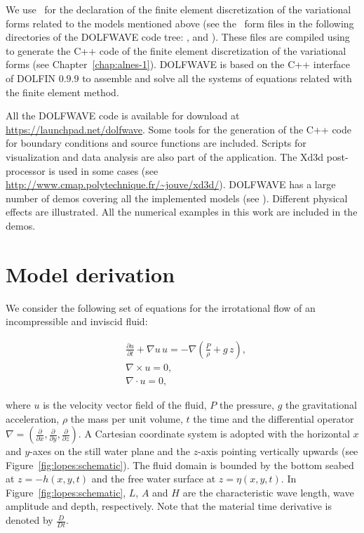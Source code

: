 We use \ufl\ for the declaration of the finite element discretization
of the variational forms related to the models mentioned above (see
the \ufl\ form files in the following directories of the DOLFWAVE code
tree: ,  and
).  These files are compiled using \ffc to
generate the C++ code of the finite element discretization of the
variational forms (see Chapter~\ref{chap:alnes-1}).  DOLFWAVE is based
on the C++ interface of DOLFIN $0.9.9$ to assemble and solve all the
systems of equations related with the finite element method.

All the DOLFWAVE code is available for download at
\url{https://launchpad.net/dolfwave}. Some tools for the generation of
the C++ code for boundary conditions and source functions are
included. Scripts for visualization and data analysis are also part of
the application. The Xd3d post-processor is used in some cases (see
\url{http://www.cmap.polytechnique.fr/~jouve/xd3d/}).  DOLFWAVE
has a large number of demos covering all the implemented models (see
). Different physical effects are illustrated.  All
the numerical examples in this work are included in the demos.


\section{Model derivation}
\label{sec:lopes:modelderivation}

We consider the following set of equations for the irrotational flow
of an incompressible and inviscid fluid:

\begin{subequations}\label{eq:lopes:euler}
\begin{align}
&\displaystyle\frac{\partial u}{\partial t}+\nabla u \,
  u=-\nabla\left(\frac{P}{\rho} +g\,
  z\right),\label{eq:lopes:euler-a} \\ &\nabla\times
  u={0},\label{eq:lopes:euler-b}
  \\ &\nabla\cdot{u}=0,\label{eq:lopes:euler-c}
\end{align}
\end{subequations}

where $u$ is the velocity vector field of the fluid, $P$ the pressure,
$g$ the gravitational acceleration, $\rho$ the mass per unit volume,
$t$ the time and the differential operator
$\nabla=\left(\frac{\partial }{\partial x},\frac{\partial }{\partial
y},\frac{\partial }{\partial z}\right).$ A Cartesian coordinate system
is adopted with the horizontal $x$ and $y$-axes on the still water
plane and the $z$-axis pointing vertically upwards (see
Figure~\ref{fig:lopes:schematic}).  The fluid domain is bounded by the
bottom seabed at $z=-h(x,y,t)$ and the free water surface at
$z=\eta(x,y,t)$.  In Figure~\ref{fig:lopes:schematic}, $L$, $A$ and
$H$ are the characteristic wave length, wave amplitude and depth,
respectively. Note that the material time derivative is denoted by
$\frac{D}{D t}$.

